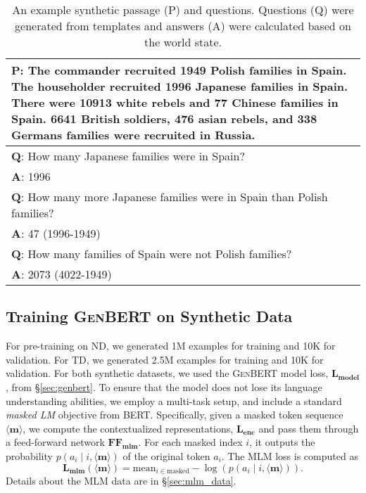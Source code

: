 \documentclass[11pt,a4paper]{article}
\newcommand\bert{\textsc{BERT}}
\newcommand\genbert{\textsc{GenBERT}}
\begin{document}
\begin{table}[t]\setlength{\abovecaptionskip}{-2pt}\setlength{\belowcaptionskip}{-15pt}
\begin{center}
\footnotesize
\begin{tabular}{p{7.2cm}}
\toprule
\textbf{P}: The commander recruited 1949 Polish families in Spain. The householder recruited 1996 Japanese families in Spain. There were 10913 white rebels and 77 Chinese families in Spain. 6641 British soldiers, 476 asian rebels, and 338 Germans families were recruited in Russia. \\ \hline
\textbf{Q}: How many Japanese families were in Spain? \\
\textbf{A}: 1996 \\ 
\textbf{Q}: How many more Japanese families were in Spain than Polish families? \\
\textbf{A}: 47 (1996-1949) \\ 
\textbf{Q}: How many families of Spain were not Polish families? \\
\textbf{A}: 2073 (4022-1949) \\
\toprule
\end{tabular}
\end{center}
\caption{An example synthetic passage (P) and questions. Questions (Q) were generated from templates and answers (A) were calculated based on the world state.}
\label{table:synthetic_textual_example}
\end{table}


\subsection{Training \genbert{} on Synthetic Data}


For pre-training on ND, we generated 1M examples for training and 10K for validation. For TD, we generated 2.5M examples for training and 10K for validation. For both synthetic datasets, we used the \genbert{} model loss, $\mathbf{L_{\text{model}}}$, from \S\ref{sec:genbert}. To ensure that the model does not lose its language understanding abilities, we employ a multi-task setup, and include a standard \emph{masked LM} objective from \bert{}. Specifically, given a masked token sequence $\langle\mathbf{m}\rangle$,
we compute the contextualized representations, $\mathbf{L_{enc}}$ and
pass them through a feed-forward network $\mathbf{FF_{\text{mlm}}}$. For each masked index $i$, it outputs the probability $p(a_i \mid i,\langle\mathbf{m}\rangle)$ of the original token $a_i$. The MLM loss is computed as 
$$\mathbf{L_{\text{mlm}}}(\langle\mathbf{m}\rangle) = \mathrm{mean}_{i \in \text{masked}} -\log(p(a_i \mid i, \langle\mathbf{m}\rangle)).$$
Details about the MLM data are in \S\ref{sec:mlm_data}.
\end{document}
